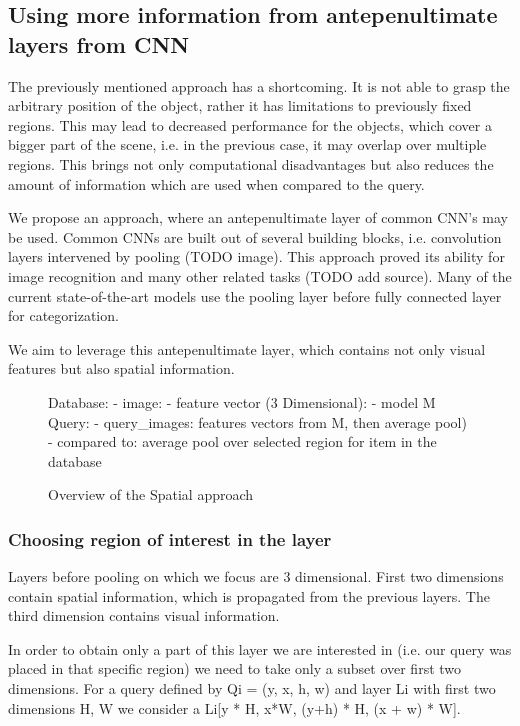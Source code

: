 \subsection{Using more information from antepenultimate layers from CNN}

The previously mentioned approach has a shortcoming. It is not able to grasp the arbitrary position of the object, rather it has limitations to previously fixed regions. This may lead to decreased performance for the objects, which cover a bigger part of the scene, i.e. in the previous case, it may overlap over multiple regions. This brings not only computational disadvantages but also reduces the amount of information which are used when compared to the query.

We propose an approach, where an antepenultimate layer of common CNN's may be used. Common CNNs are built out of several building blocks, i.e. convolution layers intervened by pooling (TODO image). This approach proved its ability for image recognition and many other related tasks (TODO add source). Many of the current state-of-the-art models use the pooling layer before fully connected layer for categorization.

We aim to leverage this antepenultimate layer, which contains not only visual features but also spatial information.

\begin{figure}
\centering
\begin{boxedverbatim}
Database:
    - image:
        - feature vector (3 Dimensional):
    - model M
Query:
    - query_images: features vectors from M, then average pool)
    - compared to: average pool over selected region for item 
                   in the database
\end{boxedverbatim}
\caption{Overview of the Spatial approach}
\end{figure}


\subsubsection{Choosing region of interest in the layer}

Layers before pooling on which we focus are 3 dimensional. First two dimensions contain spatial information, which is propagated from the previous layers. The third dimension contains visual information.

In order to obtain only a part of this layer we are interested in (i.e. our query was placed in that specific region) we need to take only a subset over first two dimensions. For a query defined by Qi = (y, x, h, w) and layer Li with first two dimensions H, W we consider a Li[y * H, x*W, (y+h) * H, (x + w) * W]. 

